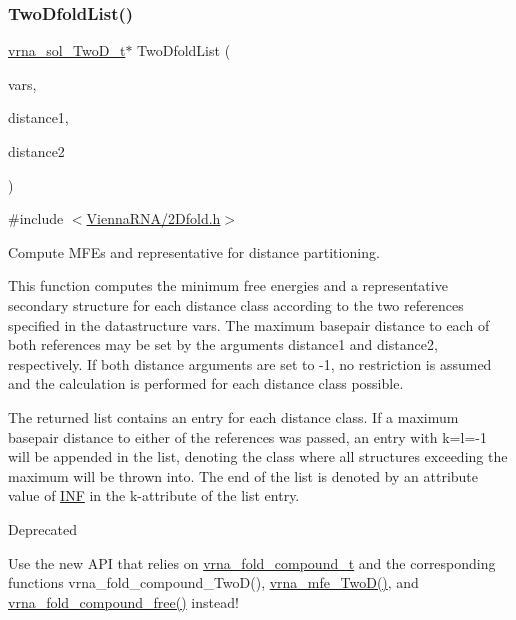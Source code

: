 \subsubsection{\texorpdfstring{Two\+Dfold\+List()}{TwoDfoldList()}}
{\footnotesize\ttfamily \hyperlink{group__kl__neighborhood__mfe_structvrna__sol__TwoD__t}{vrna\+\_\+sol\+\_\+\+Two\+D\+\_\+t}$\ast$ Two\+Dfold\+List (\begin{DoxyParamCaption}\item[{\hyperlink{group__kl__neighborhood__mfe_structTwoDfold__vars}{Two\+Dfold\+\_\+vars} $\ast$}]{vars,  }\item[{int}]{distance1,  }\item[{int}]{distance2 }\end{DoxyParamCaption})}



{\ttfamily \#include $<$\hyperlink{2Dfold_8h}{Vienna\+R\+N\+A/2\+Dfold.\+h}$>$}



Compute M\+FE\textquotesingle{}s and representative for distance partitioning. 

This function computes the minimum free energies and a representative secondary structure for each distance class according to the two references specified in the datastructure \textquotesingle{}vars\textquotesingle{}. The maximum basepair distance to each of both references may be set by the arguments \textquotesingle{}distance1\textquotesingle{} and \textquotesingle{}distance2\textquotesingle{}, respectively. If both distance arguments are set to \textquotesingle{}-\/1\textquotesingle{}, no restriction is assumed and the calculation is performed for each distance class possible.

The returned list contains an entry for each distance class. If a maximum basepair distance to either of the references was passed, an entry with k=l=-\/1 will be appended in the list, denoting the class where all structures exceeding the maximum will be thrown into. The end of the list is denoted by an attribute value of \hyperlink{constants_8h_a12c2040f25d8e3a7b9e1c2024c618cb6}{I\+NF} in the k-\/attribute of the list entry.

\begin{DoxyRefDesc}{Deprecated}
\item[\hyperlink{deprecated__deprecated000004}{Deprecated}]Use the new A\+PI that relies on \hyperlink{group__fold__compound_ga1b0cef17fd40466cef5968eaeeff6166}{vrna\+\_\+fold\+\_\+compound\+\_\+t} and the corresponding functions vrna\+\_\+fold\+\_\+compound\+\_\+\+Two\+D(), \hyperlink{group__kl__neighborhood__mfe_ga243c288b463147352829df04de6a2f77}{vrna\+\_\+mfe\+\_\+\+Two\+D()}, and \hyperlink{group__fold__compound_ga576a077b418a9c3650e06f8e5d296fc2}{vrna\+\_\+fold\+\_\+compound\+\_\+free()} instead!\end{DoxyRefDesc}



